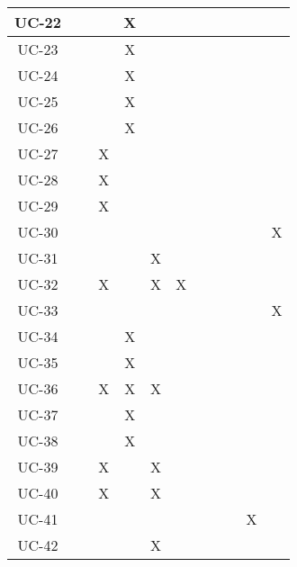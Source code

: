 \begin{table}[!ht]
\begin{tabular}{|c|c|c|c|c|c|c|c|c|c|}
        UC-22 & ~ & ~ & X & ~ & ~ & ~ & ~ & ~ & ~ \\ \hline
        UC-23 & ~ & ~ & X & ~ & ~ & ~ & ~ & ~ & ~ \\ \hline
        UC-24 & ~ & ~ & X & ~ & ~ & ~ & ~ & ~ & ~ \\ \hline
        UC-25 & ~ & ~ & X & ~ & ~ & ~ & ~ & ~ & ~ \\ \hline
        UC-26 & ~ & ~ & X & ~ & ~ & ~ & ~ & ~ & ~ \\ \hline
        UC-27 & ~ & X & ~ & ~ & ~ & ~ & ~ & ~ & ~ \\ \hline
        UC-28 & ~ & X & ~ & ~ & ~ & ~ & ~ & ~ & ~ \\ \hline
        UC-29 & ~ & X & ~ & ~ & ~ & ~ & ~ & ~ & ~ \\ \hline
        UC-30 & ~ & ~ & ~ & ~ & ~ & ~ & ~ & ~ & X \\ \hline
        UC-31 & ~ & ~ & ~ & X & ~ & ~ & ~ & ~ & ~ \\ \hline
        UC-32 & ~ & X & ~ & X & X & ~ & ~ & ~ & ~ \\ \hline
        UC-33 & ~ & ~ & ~ & ~ & ~ & ~ & ~ & ~ & X \\ \hline
        UC-34 & ~ & ~ & X & ~ & ~ & ~ & ~ & ~ & ~ \\ \hline
        UC-35 & ~ & ~ & X & ~ & ~ & ~ & ~ & ~ & ~ \\ \hline
        UC-36 & ~ & X & X & X & ~ & ~ & ~ & ~ & ~ \\ \hline
        UC-37 & ~ & ~ & X & ~ & ~ & ~ & ~ & ~ & ~ \\ \hline
        UC-38 & ~ & ~ & X & ~ & ~ & ~ & ~ & ~ & ~ \\ \hline
        UC-39 & ~ & X & ~ & X & ~ & ~ & ~ & ~ & ~ \\ \hline
        UC-40 & ~ & X & ~ & X & ~ & ~ & ~ & ~ & ~ \\ \hline
        UC-41 & ~ & ~ & ~ & ~ & ~ & ~ & ~ & X & ~ \\ \hline
        UC-42 & ~ & ~ & ~ & X & ~ & ~ & ~ & ~ & ~ \\ \hline
    \end{tabular}
\end{table}

\newpage
